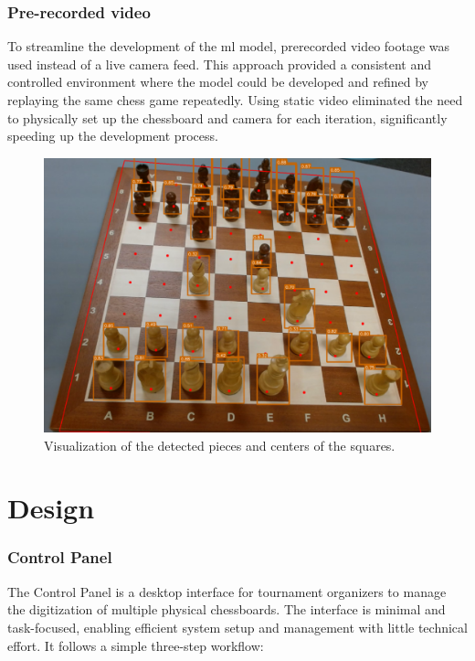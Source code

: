 \newpage

\subsubsection*{Pre-recorded video}

To streamline the development of the \gls{ml} model, prerecorded video footage was used instead of a live camera feed. This approach provided a consistent and controlled environment where the model could be developed and refined by replaying the same chess game repeatedly. Using static video eliminated the need to physically set up the chessboard and camera for each iteration, significantly speeding up the development process. \\

\begin{figure}[h!]
    \centering
    \includegraphics[width=0.75\linewidth]{figures/methods/ml-models/piece-model.png}
    \caption[Visualization of piece model and corner model]{Visualization of the detected pieces and centers of the squares.}
    \label{fig:websocket-vs-http}
\end{figure}

\section{Design}
\label{subsec:wireframe}

\subsubsection*{Control Panel}

The Control Panel is a desktop interface for tournament organizers to manage the digitization of multiple physical chessboards. The interface is minimal and task-focused, enabling efficient system setup and management with little technical effort. It follows a simple three-step workflow:

